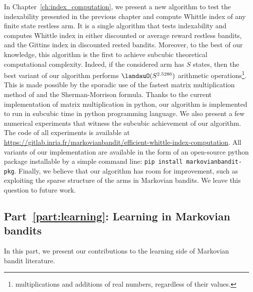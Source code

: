 In Chapter~\ref{ch:index_computation}, we present a new algorithm to test the indexability presented in the previous chapter and compute Whittle index of any finite state restless arm.
It is a single algorithm that tests indexability and computes Whittle index in either discounted or average reward restless bandits, and the Gittins index in discounted rested bandits.
Moreover, to the best of our knowledge, this algorithm is the first to achieve subcubic theoretical computational complexity.
Indeed, if the considered arm has $S$ states, then the best variant of our algorithm performs $\landauO(S^{2.5286})$ arithmetic operations\footnote{multiplications and additions of real numbers, regardless of their values.}.
This is made possible by the sporadic use of the fastest matrix multiplication method of \cite{coppersmith1987matrix} and the Sherman-Morrison formula.
Thanks to the current implementation of matrix multiplication in python, our algorithm is implemented to run in subcubic time in python programming language.
We also present a few numerical experiments that witness the subcubic achievement of our algorithm.
The code of all experiments is available at \url{https://gitlab.inria.fr/markovianbandit/efficient-whittle-index-computation}.
All variants of our implementation are available in the form of an open-source python package installable by a simple command line: \texttt{pip install markovianbandit-pkg}.
Finally, we believe that our algorithm has room for improvement, such as exploiting the sparse structure of the arms in Markovian bandits. We leave this question to future work.

\subsection{Part~{\ref{part:learning}}: Learning in Markovian bandits}

In this part, we present our contributions to the learning side of Markovian bandit literature.

